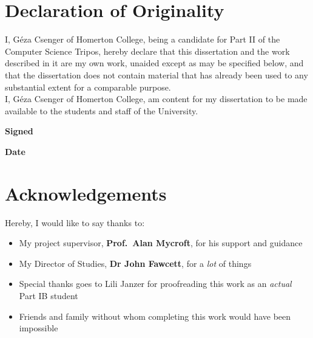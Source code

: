 \documentclass[%
    12pt,
    bibliography=toc,
    listof=leveldown,%
    oneside
]{book}
\begin{document}


\frontmatter

\section*{Declaration of Originality}

I, Géza Csenger of Homerton College, being a candidate for Part II of the 
Computer Science Tripos, hereby declare that this dissertation and the work
described in it are my own work, unaided except as may be specified below, and
that the dissertation does not contain material that has already been used to
any substantial extent for a comparable purpose.\\

\noindent
I, Géza Csenger of Homerton College,
am content for my dissertation to be made available to the students and staff
of the University. 

\vspace{1cm}
\textbf{Signed}

\vspace{1cm}
\textbf{Date}

\vspace{3cm}

\section*{Acknowledgements}

Hereby, I would like to say thanks to:
\begin{itemize}
    \item My project supervisor, \textbf{Prof.\ Alan Mycroft}, for his support
        and guidance
    \item My Director of Studies, \textbf{Dr John Fawcett}, for a \emph{lot} of
        things
    \item Special thanks goes to Lili Janzer for proofreading this work as an \emph{actual} Part IB student
    \item Friends and family without whom completing this work would have been impossible
\end{itemize}

\newpage
\end{document}

